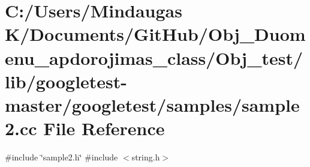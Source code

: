 \hypertarget{_obj__test_2lib_2googletest-master_2googletest_2samples_2sample2_8cc}{}\section{C\+:/\+Users/\+Mindaugas K/\+Documents/\+Git\+Hub/\+Obj\+\_\+\+Duomenu\+\_\+apdorojimas\+\_\+class/\+Obj\+\_\+test/lib/googletest-\/master/googletest/samples/sample2.cc File Reference}
\label{_obj__test_2lib_2googletest-master_2googletest_2samples_2sample2_8cc}
{\ttfamily \#include \char`\"{}sample2.\+h\char`\"{}}\newline
{\ttfamily \#include $<$string.\+h$>$}\newline
